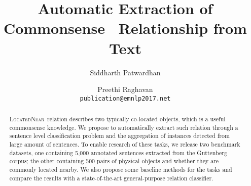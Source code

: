 \documentclass[11pt,letterpaper]{article}
\title{Automatic Extraction of Commonsense \lnear\ Relationship from Text}
\author{Siddharth Patwardhan \and Preethi Raghavan \\
  {\tt publication@emnlp2017.net}}
\date{}
\newcommand{\lnear}{\textsc{LocatedNear}}
\begin{document}
\maketitle

\begin{abstract}
\lnear~relation describes two typically co-located objects, which
is a useful commonsense knowledge. 
We propose to automatically extract such relation through
a sentence level classification problem and the aggregation of
instances detected from large amount of sentences.
To enable research of these tasks, we release two benchmark datasets, 
one containing 5,000 annotated sentences extracted from the Guttenberg corpus; 
the other containing 500 pairs of physical objects and whether they are 
commonly located nearby.
We also propose some baseline methods for the tasks and compare the results with
a state-of-the-art general-purpose relation classifier.
\end{abstract}















\end{document}
